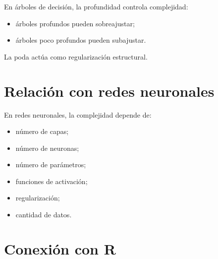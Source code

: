 \documentclass[
  spanish,
  11pt,
  letterpaper,
  DIV=11,
  numbers=noendperiod]{scrreprt}
\providecommand{\tightlist}{%
  \setlength{\itemsep}{0pt}\setlength{\parskip}{0pt}}
\theoremstyle{definition}
\theoremstyle{plain}
\theoremstyle{definition}
\theoremstyle{remark}
\begin{document}
En árboles de decisión, la profundidad controla complejidad:

\begin{itemize}
\tightlist
\item
  árboles profundos pueden sobreajustar;
\item
  árboles poco profundos pueden subajustar.
\end{itemize}

La poda actúa como regularización estructural.

\section{Relación con redes
neuronales}\label{relaciuxf3n-con-redes-neuronales-2}

En redes neuronales, la complejidad depende de:

\begin{itemize}
\tightlist
\item
  número de capas;
\item
  número de neuronas;
\item
  número de parámetros;
\item
  funciones de activación;
\item
  regularización;
\item
  cantidad de datos.
\end{itemize}

\section{Conexión con R}\label{conexiuxf3n-con-r-4}
\end{document}
